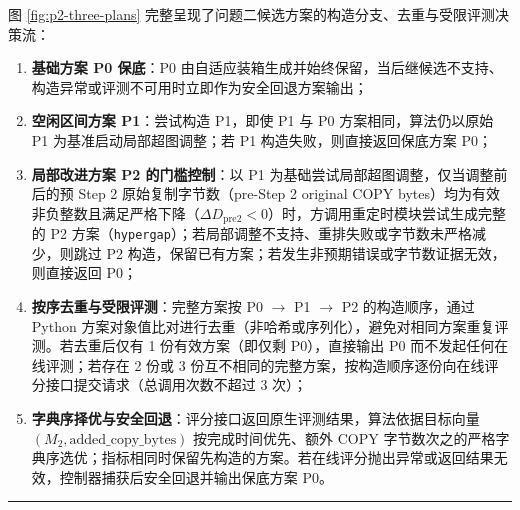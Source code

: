 \documentclass[anonymous,withtoc]{gmcm2026}
\providecommand{\tightlist}{\setlength{\itemsep}{0pt}\setlength{\parskip}{0pt}}
\begin{document}
图 \ref{fig:p2-three-plans} 完整呈现了问题二候选方案的构造分支、去重与受限评测决策流：

\begin{enumerate}
\def\labelenumi{\arabic{enumi}.}
\tightlist
\item
  \textbf{基础方案 P0 保底}：P0 由自适应装箱生成并始终保留，当后继候选不支持、构造异常或评测不可用时立即作为安全回退方案输出；
\item
  \textbf{空闲区间方案 P1}：尝试构造 P1，即使 P1 与 P0 方案相同，算法仍以原始 P1 为基准启动局部超图调整；若 P1 构造失败，则直接返回保底方案 P0；
\item
  \textbf{局部改进方案 P2 的门槛控制}：以 P1 为基础尝试局部超图调整，仅当调整前后的预 Step 2 原始复制字节数（pre-Step 2 original COPY bytes）均为有效非负整数且满足严格下降（\(\Delta D_{\mathrm{pre2}} < 0\)）时，方调用重定时模块尝试生成完整的 P2 方案（\texttt{hypergap}）；若局部调整不支持、重排失败或字节数未严格减少，则跳过 P2 构造，保留已有方案；若发生非预期错误或字节数证据无效，则直接返回 P0；
\item
  \textbf{按序去重与受限评测}：完整方案按 P0 \(\to\) P1 \(\to\) P2 的构造顺序，通过 Python 方案对象值比对进行去重（非哈希或序列化），避免对相同方案重复评测。若去重后仅有 1 份有效方案（即仅剩 P0），直接输出 P0 而不发起任何在线评测；若存在 2 份或 3 份互不相同的完整方案，按构造顺序逐份向在线评分接口提交请求（总调用次数不超过 3 次）；
\item
  \textbf{字典序择优与安全回退}：评分接口返回原生评测结果，算法依据目标向量 \((M_2,\allowbreak \text{added\_copy\_bytes})\) 按完成时间优先、额外 COPY 字节数次之的严格字典序选优；指标相同时保留先构造的方案。若在线评分抛出异常或返回结果无效，控制器捕获后安全回退并输出保底方案 P0。
\end{enumerate}

\FloatBarrier
\par{}\begingroup\normalsize
\captionsetup{type=algorithm,position=top,justification=raggedright,singlelinecheck=false,labelfont=bf}
\label{alg:p2-adaptive-hypergap}
\nopagebreak\hrule\nopagebreak
\end{document}
